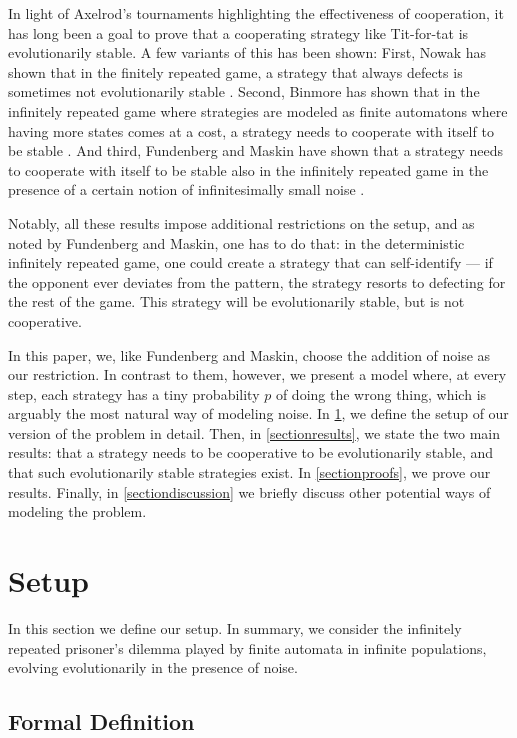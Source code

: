 \documentclass[11pt]{amsart}
\theoremstyle{definition}
\theoremstyle{remark}
\begin{document}
In light of Axelrod's tournaments highlighting the effectiveness of cooperation, it has long been a goal to prove that a cooperating strategy like Tit-for-tat is evolutionarily stable. A few variants of this has been shown: First, Nowak has shown that in the finitely repeated game, a strategy that always defects is sometimes not evolutionarily stable \cite{nowak2004emergence}. Second, Binmore has shown that in the infinitely repeated game where strategies are modeled as finite automatons where having more states comes at a cost, a strategy needs to cooperate with itself to be stable \cite{binmore1992evolutionary}. And third, Fundenberg and Maskin have shown that a strategy needs to cooperate with itself to be stable also in the infinitely repeated game in the presence of a certain notion of infinitesimally small noise \cite{fundenberg1990evolution}.

Notably, all these results impose additional restrictions on the setup, and as noted by Fundenberg and Maskin, one has to do that: in the deterministic infinitely repeated game, one could create a strategy that can self-identify — if the opponent ever deviates from the pattern, the strategy resorts to defecting for the rest of the game. This strategy will be evolutionarily stable, but is not cooperative. 

In this paper, we, like Fundenberg and Maskin, choose the addition of noise as our restriction. In contrast to them, however, we present a model where, at every step, each strategy has a tiny probability $p$ of doing the wrong thing, which is arguably the most natural way of modeling noise. In \cref{sectionsetup}, we define the setup of our version of the problem in detail. Then, in \cref{sectionresults}, we state the two main results: that a strategy needs to be cooperative to be evolutionarily stable, and that such evolutionarily stable strategies exist. In \cref{sectionproofs}, we prove our results. Finally, in \cref{sectiondiscussion} we briefly discuss other potential ways of modeling the problem.

\section{Setup}
\label{sectionsetup}

In this section we define our setup. In summary, we consider the infinitely repeated prisoner's dilemma played by finite automata in infinite populations, evolving evolutionarily in the presence of noise.

\subsection{Formal Definition}
\end{document}
